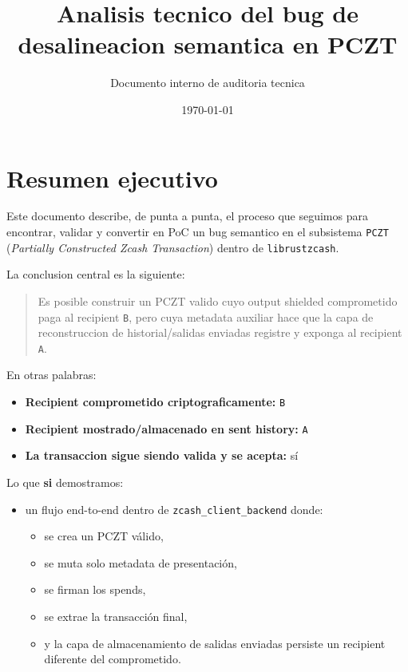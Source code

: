 \documentclass[11pt,a4paper]{article}
\title{Analisis tecnico del bug de desalineacion semantica en PCZT}
\author{Documento interno de auditoria tecnica}
\date{\today}
\begin{document}
\maketitle

\tableofcontents
\newpage

\section{Resumen ejecutivo}

Este documento describe, de punta a punta, el proceso que seguimos para encontrar, validar y convertir en PoC un bug semantico en el subsistema \texttt{PCZT} (\textit{Partially Constructed Zcash Transaction}) dentro de \texttt{librustzcash}.

La conclusion central es la siguiente:

\begin{quote}
Es posible construir un PCZT valido cuyo output shielded comprometido paga al recipient \texttt{B}, pero cuya metadata auxiliar hace que la capa de reconstruccion de historial/salidas enviadas registre y exponga al recipient \texttt{A}.
\end{quote}

En otras palabras:

\begin{itemize}[leftmargin=2em]
    \item \textbf{Recipient comprometido criptograficamente:} \texttt{B}
    \item \textbf{Recipient mostrado/almacenado en sent history:} \texttt{A}
    \item \textbf{La transaccion sigue siendo valida y se acepta:} sí
\end{itemize}

Lo que \textbf{si} demostramos:

\begin{itemize}[leftmargin=2em]
    \item un flujo end-to-end dentro de \texttt{zcash\_client\_backend} donde:
    \begin{itemize}
        \item se crea un PCZT válido,
        \item se muta solo metadata de presentación,
        \item se firman los spends,
        \item se extrae la transacción final,
        \item y la capa de almacenamiento de salidas enviadas persiste un recipient diferente del comprometido.
    \end{itemize}
\end{itemize}
\end{document}
